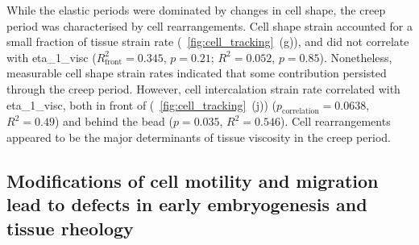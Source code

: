 While the elastic periods were dominated by changes in cell shape, the creep period was characterised by cell rearrangements.
Cell shape strain accounted for a small fraction of tissue strain rate (\figurename~\ref{fig:cell_tracking}~(g)), and did not correlate with \gls{eta_1_visc}
(\(R_\text{front}^2 = 0.345\), \(p = 0.21\); \(R^2 =	0.052\), \(p = 0.85\)).
Nonetheless, measurable cell shape strain rates indicated that some contribution persisted through the creep period.
However, cell intercalation strain rate correlated with \gls{eta_1_visc}, both in front of (\figurename~\ref{fig:cell_tracking}~(j))
(\(p_\text{correlation} = 0.0638\), \(R^2 = 0.49\)) and behind the bead (\(p = 0.035\), \(R^2 =	0.546\)).
Cell rearrangements appeared to be the major determinants of tissue viscosity in the creep period.


%
\subsection{Modifications of cell motility and migration lead to defects in early embryogenesis and tissue rheology}

